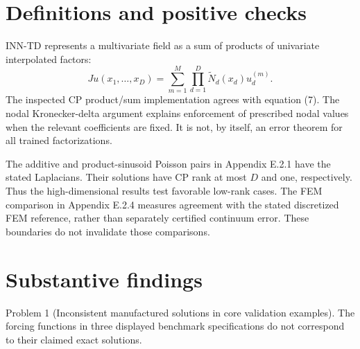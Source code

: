 \documentclass[10pt]{article}
\begin{document}
\section*{Definitions and positive checks}
INN-TD represents a multivariate field as a sum of products of univariate interpolated factors: \[Ju(x_1,\ldots,x_D)=\sum_{m=1}^{M}\prod_{d=1}^{D}
 \widetilde N_d(x_d)u_d^{(m)}.\] The inspected CP product/sum implementation agrees with equation (7). The nodal Kronecker-delta argument explains enforcement of prescribed nodal values when the relevant coefficients are fixed. It is not, by itself, an error theorem for all trained factorizations.\par
The additive and product-sinusoid Poisson pairs in Appendix E.2.1 have the stated Laplacians. Their solutions have CP rank at most \(D\) and one, respectively. Thus the high-dimensional results test favorable low-rank cases. The FEM comparison in Appendix E.2.4 measures agreement with the stated discretized FEM reference, rather than separately certified continuum error. These boundaries do not invalidate those comparisons.\par
\section*{Substantive findings}
Problem 1 (Inconsistent manufactured solutions in core validation examples).  The forcing functions in three displayed benchmark specifications do not correspond to their claimed exact solutions.\par
\end{document}

